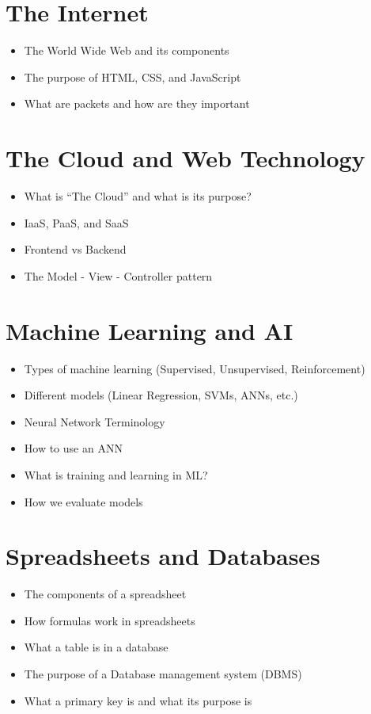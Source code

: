 \documentclass{article}
\begin{document}
\section*{The Internet}
\begin{itemize}
    \item The World Wide Web and its components
    \item The purpose of HTML, CSS, and JavaScript 
    \item What are packets and how are they important
\end{itemize}

\section*{The Cloud and Web Technology}
\begin{itemize}
    \item What is ``The Cloud'' and what is its purpose?
    \item IaaS, PaaS, and SaaS
    \item Frontend vs Backend
    \item The Model - View - Controller pattern
\end{itemize}

\newpage
\section*{Machine Learning and AI}
\begin{itemize}
    \item Types of machine learning (Supervised, Unsupervised, Reinforcement)
    \item Different models (Linear Regression, SVMs, ANNs, etc.)
    \item Neural Network Terminology
    \item How to use an ANN
    \item What is training and learning in ML?
    \item How we evaluate models
\end{itemize}

\section*{Spreadsheets and Databases}
\begin{itemize}
    \item The components of a spreadsheet
    \item How formulas work in spreadsheets
    \item What a table is in a database
    \item The purpose of a Database management system (DBMS)
    \item What a primary key is and what its purpose is
\end{itemize}
\end{document}
